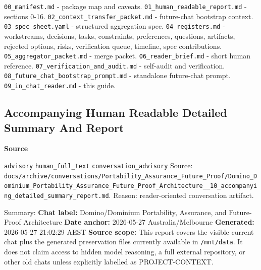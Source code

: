 \documentclass[9pt,a4paper,openany]{book}
\newcommand{\vonecallout}[3]{\par\medskip\noindent\begingroup\setlength{\fboxsep}{7pt}\colorbox{DomCalloutBg}{\parbox{0.94\linewidth}{\textbf{\textcolor{#1}{#2}}\par #3}}\endgroup\par\medskip}
\begin{document}
\texttt{00\_\allowbreak{}manifest.\allowbreak{}md} -\allowbreak{} package map and caveats.\allowbreak{} \texttt{01\_\allowbreak{}human\_\allowbreak{}readable\_\allowbreak{}report.\allowbreak{}md} -\allowbreak{} sections 0-\allowbreak{}16.\allowbreak{} \texttt{02\_\allowbreak{}context\_\allowbreak{}transfer\_\allowbreak{}packet.\allowbreak{}md} -\allowbreak{} future-\allowbreak{}chat bootstrap context.\allowbreak{} \texttt{03\_\allowbreak{}spec\_\allowbreak{}sheet.\allowbreak{}yaml} -\allowbreak{} structured aggregation spec.\allowbreak{} \texttt{04\_\allowbreak{}registers.\allowbreak{}md} -\allowbreak{} workstreams, decisions, tasks, constraints, preferences, questions, artifacts, rejected options, risks, verification queue, timeline, spec contributions.\allowbreak{} \texttt{05\_\allowbreak{}aggregator\_\allowbreak{}packet.\allowbreak{}md} -\allowbreak{} merge packet.\allowbreak{} \texttt{06\_\allowbreak{}reader\_\allowbreak{}brief.\allowbreak{}md} -\allowbreak{} short human reference.\allowbreak{} \texttt{07\_\allowbreak{}verification\_\allowbreak{}and\_\allowbreak{}audit.\allowbreak{}md} -\allowbreak{} self-\allowbreak{}audit and verification.\allowbreak{} \texttt{08\_\allowbreak{}future\_\allowbreak{}chat\_\allowbreak{}bootstrap\_\allowbreak{}prompt.\allowbreak{}md} -\allowbreak{} standalone future-\allowbreak{}chat prompt.\allowbreak{} \texttt{09\_\allowbreak{}in\_\allowbreak{}chat\_\allowbreak{}reader.\allowbreak{}md} -\allowbreak{} this guide.\allowbreak{}



\subsection{Accompanying Human Readable Detailed Summary And Report}

\vonecallout{DomSlate}{Source}{\texttt{advisory} \texttt{human\_\allowbreak{}full\_\allowbreak{}text} \texttt{conversation\_\allowbreak{}advisory} Source: \texttt{docs/\allowbreak{}archive/\allowbreak{}conversations/\allowbreak{}Portability\_\allowbreak{}Assurance\_\allowbreak{}Future\_\allowbreak{}Proof/\allowbreak{}Domino\_\allowbreak{}Dominium\_\allowbreak{}Portability\_\allowbreak{}Assurance\_\allowbreak{}Future\_\allowbreak{}Proof\_\allowbreak{}Architecture\_\allowbreak{}\_\allowbreak{}10\_\allowbreak{}accompanying\_\allowbreak{}detailed\_\allowbreak{}summary\_\allowbreak{}report.\allowbreak{}md}.\allowbreak{} Reason: reader-\allowbreak{}oriented conversation artifact.\allowbreak{}}

Summary: \textbf{Chat label:} Domino/\allowbreak{}Dominium Portability, Assurance, and Future-\allowbreak{}Proof Architecture \textbf{Date anchor:} 2026-\allowbreak{}05-\allowbreak{}27 Australia/\allowbreak{}Melbourne \textbf{Generated:} 2026-\allowbreak{}05-\allowbreak{}27 21:02:29 AEST \textbf{Source scope:} This report covers the visible current chat plus the generated preservation files currently available in \texttt{/\allowbreak{}mnt/\allowbreak{}data}.\allowbreak{} It does not claim access to hidden model reasoning, a full external repository, or other old chats unless explicitly labelled as PROJECT-\allowbreak{}CONTEXT.\allowbreak{}
\end{document}
